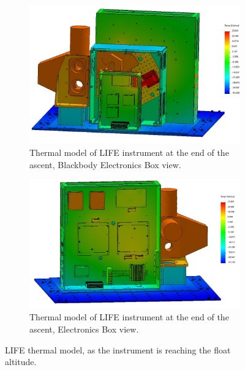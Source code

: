 \begin{figure}
    \centering
    \begin{subfigure}[h]{0.9\textwidth}
        \centering
        \includegraphics[width=\textwidth]{chap4_images/ascent_images/ascent_pt1/Test_30_BBEbox.JPG}
        \caption{Thermal model of LIFE instrument at the end of the ascent, Blackbody Electronics Box view.}
        \label{fig:ascent_pt2_model_bbebox}
    \end{subfigure}
    \begin{subfigure}[h]{0.9\textwidth}
        \centering
        \includegraphics[width=\textwidth]{chap4_images/ascent_images/ascent_pt1/Test_30_Ebox.JPG}
        \caption{Thermal model of LIFE instrument at the end of the ascent, Electronics Box view.}
        \label{fig:ascent_pt2_model_ebox}
    \end{subfigure}
    \caption{LIFE thermal model, as the instrument is reaching the float altitude.}
    \label{ascent_pt2_model}
\end{figure}

